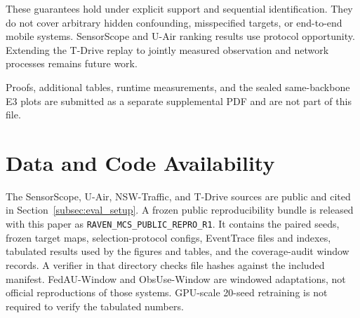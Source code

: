 \documentclass[letterpaper,journal]{IEEEtran}
\begin{document}
These guarantees hold under explicit support and sequential
identification.  They do not cover arbitrary hidden confounding,
misspecified targets, or end-to-end mobile systems.  SensorScope and U-Air
ranking results use protocol opportunity.  Extending the T-Drive replay to
jointly measured observation and network processes remains future work.

Proofs, additional tables, runtime measurements, and the sealed
same-backbone E3 plots are submitted as a separate supplemental PDF
and are not part of this file.

\section*{Data and Code Availability}
The SensorScope, U-Air, NSW-Traffic, and T-Drive sources are public
and cited in Section~\ref{subsec:eval_setup}.  A frozen public
reproducibility bundle is released with this paper as
\texttt{RAVEN\_MCS\_PUBLIC\_REPRO\_R1}.  It contains the paired seeds,
frozen target maps, selection-protocol configs, EventTrace files and
indexes, tabulated results used by the figures and tables, and the
coverage-audit window records.  A verifier in that directory checks
file hashes against the included manifest.  FedAU-Window and
ObsUse-Window are windowed adaptations, not official reproductions of
those systems.  GPU-scale 20-seed retraining is not required to verify
the tabulated numbers.



\end{document}
